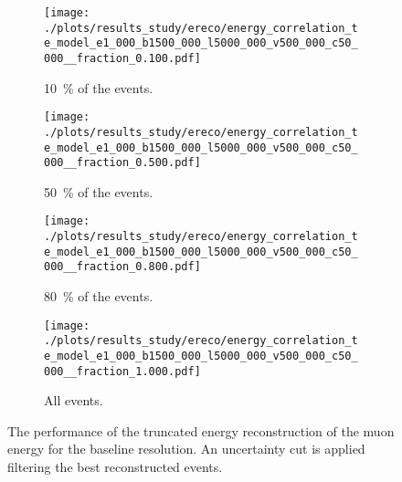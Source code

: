 \begin{figure}[H]
    \centering
    \begin{subfigure}{0.48\textwidth}
        \centering
        \texttt{[image: ./plots/results\_study/ereco/energy\_correlation\_te\_model\_e1\_000\_b1500\_000\_l5000\_000\_v500\_000\_c50\_000\_\_fraction\_0.100.pdf]}
        \caption{\SI{10}{\%} of the events.}
        \label{fig:study_ereco_te_base_perform_0.1}
    \end{subfigure}
    \hfill
    \begin{subfigure}{0.48\textwidth}
        \centering
        \texttt{[image: ./plots/results\_study/ereco/energy\_correlation\_te\_model\_e1\_000\_b1500\_000\_l5000\_000\_v500\_000\_c50\_000\_\_fraction\_0.500.pdf]}
        \caption{\SI{50}{\%} of the events.}
        \label{fig:study_ereco_te_base_perform_0.5}
    \end{subfigure}
    \begin{subfigure}{0.48\textwidth}
        \vspace{0.5cm}
        \centering
        \texttt{[image: ./plots/results\_study/ereco/energy\_correlation\_te\_model\_e1\_000\_b1500\_000\_l5000\_000\_v500\_000\_c50\_000\_\_fraction\_0.800.pdf]}
        \caption{\SI{80}{\%} of the events.}
        \label{fig:study_ereco_te_base_perform_0.8}
    \end{subfigure}
    \hfill
    \begin{subfigure}{0.48\textwidth}
        \vspace{0.5cm}
        \centering
        \texttt{[image: ./plots/results\_study/ereco/energy\_correlation\_te\_model\_e1\_000\_b1500\_000\_l5000\_000\_v500\_000\_c50\_000\_\_fraction\_1.000.pdf]}
        \caption{All events.}
        \label{fig:study_ereco_te_base_perform_1.0}
    \end{subfigure}
    \caption{The performance of the truncated energy reconstruction of the muon energy for the baseline resolution. An uncertainty cut is applied filtering the best reconstructed events.}
    \label{fig:study_ereco_te_base_perform}
\end{figure}

